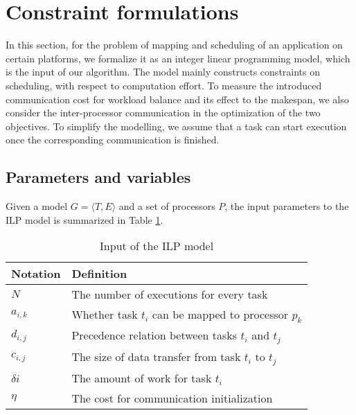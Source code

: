 \section{Constraint formulations\label{se:ilp}}
In this section, for the problem of mapping and scheduling of an application on certain platforms, we formalize it as an integer linear programming model, which is the input of our algorithm.
The model mainly constructs constraints on scheduling, with respect to computation effort.
 To measure the introduced communication cost for workload balance and its effect to the makespan, we also consider the inter-processor communication in the optimization of the two objectives. To simplify the modelling, we assume that a task can start execution once the corresponding communication is finished. 

\subsection{Parameters and variables}
Given a model $G=\langle T, E\rangle$ and a set of processors $P$, the input parameters to the ILP model is summarized in Table \ref{tab:par}.
\begin{table}[t]\centering
\caption{Input of the ILP model\label{tab:par}}
\begin{tabular}{ll}\hline
Notation & Definition \\\hline
	 $N$ & The number of executions for every task \\
	$a_{i,k}$ & Whether task $t_i$ can be mapped to processor $p_k$\\
	$d_{i,j}$ & Precedence relation between tasks $t_i$ and $t_j$\\
	 $c_{i,j}$ & The size of data transfer from task $t_i$ to $t_j$\\
	$\delta{i}$& The amount of work for task $t_i$\\
	$\eta$ & The cost for communication initialization\\
	\hline
\end{tabular}	
\end{table}


